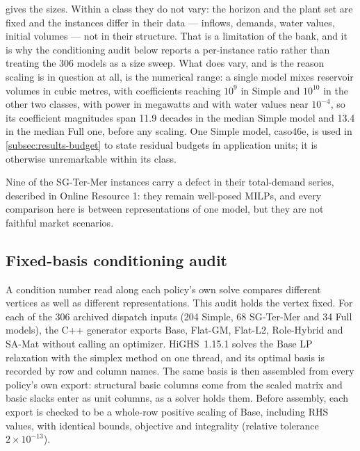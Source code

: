 \documentclass[smallextended,envcountsect,envcountsame]{svjour3}
\begin{document}
 gives the sizes. Within a class they do not vary: the horizon and the
plant set are fixed and the instances differ in their data --- inflows, demands, water values,
initial volumes --- not in their structure. That is a limitation of the bank, and it is why the
conditioning audit below reports a per-instance ratio rather than treating the 306 models as a
size sweep. What does vary, and is the reason scaling is in question at all, is the numerical
range: a single model mixes reservoir volumes in cubic metres, with coefficients reaching
$10^9$ in Simple and $10^{10}$ in the other two classes, with power in megawatts and with water
values near $10^{-4}$, so its coefficient magnitudes span 11.9 decades in the median Simple
model and 13.4 in the median Full one, before any scaling. One Simple model, caso46e, is used in
\cref{subsec:results-budget} to state residual budgets in application units; it is otherwise
unremarkable within its class.

Nine of the SG-Ter-Mer instances carry a defect in their total-demand series, described in
Online Resource 1: they remain well-posed MILPs, and every comparison here is between
representations of one model, but they are not faithful market scenarios.

\begin{table}[tb]
\centering\small
\caption{The dispatch instance bank, from the unscaled export of every model. Entries are the
median and, where it differs, the range over the class. Sizes are constant within a class;
decades is $\log_{10}$ of the ratio between the largest and smallest magnitude in a model.}
\label{tab:instance-bank}

\end{table}

\subsection{Fixed-basis conditioning audit}
\label{subsec:design-fixed-basis}
A condition number read along each policy's own solve compares different vertices as well as
different representations. This audit holds the vertex fixed. For each of the 306 archived
dispatch inputs (204 Simple, 68 SG-Ter-Mer and 34 Full models), the C++ generator exports Base,
Flat-GM, Flat-L2, Role-Hybrid and SA-Mat without calling an optimizer. HiGHS~1.15.1 solves the
Base LP relaxation with the simplex method on one thread, and its optimal basis is recorded by
row and column names. The same basis is then assembled from every policy's own export:
structural basic columns come from the scaled matrix and basic slacks enter as unit columns, as
a solver holds them. Before assembly, each export is checked to be a whole-row positive scaling
of Base, including RHS values, with identical bounds, objective and integrality (relative
tolerance $2\times10^{-13}$).
\end{document}
